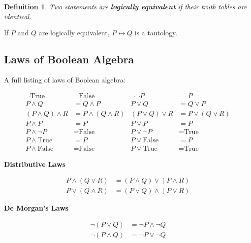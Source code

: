 \documentclass[12pt,a4paper]{article}
\newtheorem{definition}[theorem]{Definition}
\begin{document}
\begin{definition}
    Two statements are \textbf{logically equivalent} if their truth tables are identical.
\end{definition}

If $P$ and $Q$ are logically equivalent, $P \leftrightarrow Q$ is a tautology.

\subsection{Laws of Boolean Algebra}
A full listing of laws of Boolean algebra:

\vspace{-2em}

\begin{align*}
\neg \text{True} &= \text{False} & \neg \neg P &= P \\
P \land Q &= Q \land P & P \lor Q &= Q \lor P \\
(P \land Q) \land R &= P \land (Q \land R) & (P \lor Q) \lor R &= P \lor (Q \lor R) \\
P \land P &= P & P \lor P &= P \\
P \land \neg P &= \text{False} & P \lor \neg P &= \text{True} \\
P \land \text{True} &= P & P \lor \text{False} &= P \\
P \land \text{False} &= \text{False} & P \lor \text{True} &= \text{True}
\end{align*}

\begin{center}
\textbf{Distributive Laws}
\end{center}

\vspace{-3em}

\begin{align*}
P \land (Q \lor R) &= (P \land Q) \lor (P \land R) \\
P \lor (Q \land R) &= (P \lor Q) \land (P \lor R)
\end{align*}

\begin{center}
\textbf{De Morgan's Laws}
\end{center}

\vspace{-3em}

\begin{align*}
\neg (P \lor Q) &= \neg P \land \neg Q \\
\neg (P \land Q) &= \neg P \lor \neg Q
\end{align*}
\end{document}

